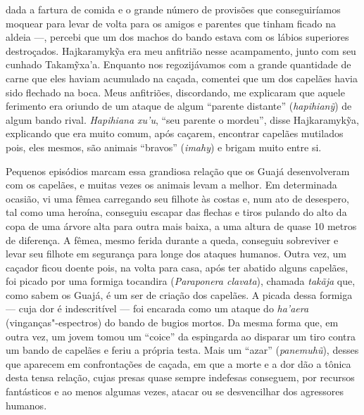 dada a fartura de comida e o grande número de provisões que
conseguiríamos moquear para levar de volta para os amigos e parentes que
tinham ficado na aldeia ---, percebi que um dos machos do bando estava com
os lábios superiores destroçados. Hajkaramykỹa era meu anfitrião nesse
acampamento, junto com seu cunhado Takamỹxa'a. Enquanto nos
regozijávamos com a grande quantidade de carne que eles haviam acumulado
na caçada, comentei que um dos capelães havia sido flechado na boca.
Meus anfitriões, discordando, me explicaram que aquele ferimento era
oriundo de um ataque de algum ``parente distante'' (\emph{hapihianỹ}) de
algum bando rival. \emph{Hapihiana xu'u}, ``seu parente o mordeu'',
disse Hajkaramykỹa, explicando que era muito comum, após caçarem,
encontrar capelães mutilados pois, eles mesmos, são animais ``bravos''
(\emph{imahy}) e brigam muito entre si.

Pequenos episódios marcam essa grandiosa relação que os Guajá
desenvolveram com os capelães, e muitas vezes os animais levam a melhor.
Em determinada ocasião, vi uma fêmea carregando seu filhote às costas e,
num ato de desespero, tal como uma heroína, conseguiu escapar das
flechas e tiros pulando do alto da copa de uma árvore alta para outra
mais baixa, a uma altura de quase 10 metros de diferença. A fêmea, mesmo
ferida durante a queda, conseguiu sobreviver e levar seu filhote em
segurança para longe dos ataques humanos. Outra vez, um caçador ficou
doente pois, na volta para casa, após ter abatido alguns capelães, foi
picado por uma formiga tocandira (\emph{Paraponera clavata}), chamada
\emph{takãja} que, como sabem os Guajá, é um ser de criação dos
capelães. A picada dessa formiga --- cuja dor é indescritível --- foi
encarada como um ataque do \emph{ha'aera} (vinganças"-espectros) do bando
de bugios mortos. Da mesma forma que, em outra vez, um jovem tomou um
``coice'' da espingarda ao disparar um tiro contra um bando de capelães
e feriu a própria testa. Mais um ``azar'' (\emph{panemuhũ}), desses que
aparecem em confrontações de caçada, em que a morte e a dor dão a tônica
desta tensa relação, cujas presas quase sempre indefesas conseguem, por
recursos fantásticos e ao menos algumas vezes, atacar ou se desvencilhar
dos agressores humanos.

